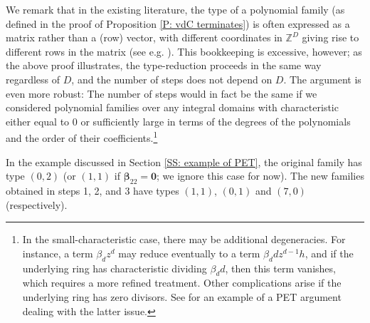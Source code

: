 \documentclass[11pt]{amsart}
\theoremstyle{definition}
\newcommand{\Z}{{\mathbb Z}}
\newcommand{\bbeta}{{\boldsymbol{\beta}}}
\begin{document}
We remark that in the existing literature, the type of a polynomial family (as defined in the proof of Proposition \ref{P: vdC terminates}) is often expressed as a matrix rather than a (row) vector, with different coordinates in $\Z^D$ giving rise to different rows in the matrix (see e.g. \cite{BL96, CFH11, DKS22}). This bookkeeping is excessive, however; as the above proof illustrates, the type-reduction proceeds in the same way regardless of $D$, and the number of steps does not depend on $D$. The argument is even more robust: The number of steps would in fact be the same if we considered polynomial families over any integral domains with characteristic either equal to $0$ or sufficiently large in terms of the degrees of the polynomials and the order of their coefficients.\footnote{In the small-characteristic case, there may be additional degeneracies. For instance, a term $\beta_d z^d$ may reduce eventually to a term $\beta_d d z^{d-1}h$, and if the underlying ring has characteristic dividing $\beta_d d$, then this term vanishes, which requires a more refined treatment. Other complications arise if the underlying ring has zero divisors. See \cite{BB23} for an example of a PET argument dealing with the latter issue.}



        In the example discussed in Section \ref{SS: example of PET}, the original family has type $(0,2)$ (or $(1,1)$ if $\bbeta_{22}=\textbf{0}$; we ignore this case for now). The new families obtained in steps 1, 2, and 3 have types $(1,1)$,
        $(0,1)$ and $(7,0)$ (respectively).


    
   
\end{document}
